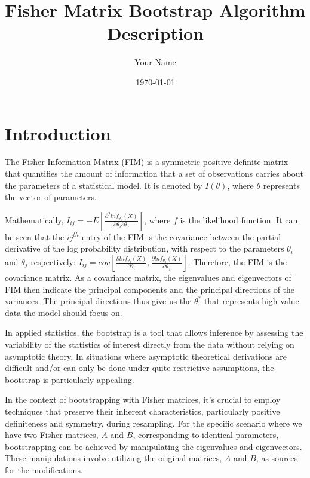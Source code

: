 \documentclass{article}
\begin{document}
\title{Fisher Matrix Bootstrap Algorithm Description}
\author{Your Name}
\date{\today}
\maketitle

\section{Introduction}
The Fisher Information Matrix (FIM) is a symmetric positive definite matrix that quantifies the amount of information that a set of observations carries about the parameters of a statistical model. It is denoted by $I(\theta)$, where $\theta$ represents the vector of parameters. 

Mathematically, $I_{ij} = -E[\frac{\partial^{2} ln f_{\theta_0}(X)}{\partial\theta_i\partial\theta_j}]$, where $f$ is the likelihood function. It can be seen that the $ij^{th}$ entry of the FIM is the covariance between the partial derivative of the log probability distribution, with respect to the parameters $\theta_i$ and $\theta_j$ respectively: $I_{ij} = cov[\frac{\partial ln f_{\theta_0}(X)}{\partial\theta_i},\frac{\partial ln f_{\theta_0}(X)}{\partial\theta_j}]$. Therefore, the FIM is the covariance matrix. As a covariance matrix, the eigenvalues and eigenvectors of FIM then indicate the principal components and the principal directions of the variances. The principal directions thus give us the $\theta^*$ that represents high value data the model should focus on. 

In applied statistics, the bootstrap is a tool that allows inference by assessing the variability of the statistics of interest directly from the data without relying on asymptotic theory. In situations where asymptotic theoretical derivations are difficult and/or can only be done under quite restrictive assumptions, the bootstrap is particularly appealing. 

In the context of bootstrapping with Fisher matrices, it's crucial to employ techniques that preserve their inherent characteristics, particularly positive definiteness and symmetry, during resampling. For the specific scenario where we have two Fisher matrices, $A$ and $B$, corresponding to identical parameters, bootstrapping can be achieved by manipulating the eigenvalues and eigenvectors. These manipulations involve utilizing the original matrices, $A$ and $B$, as sources for the modifications.
\end{document}
